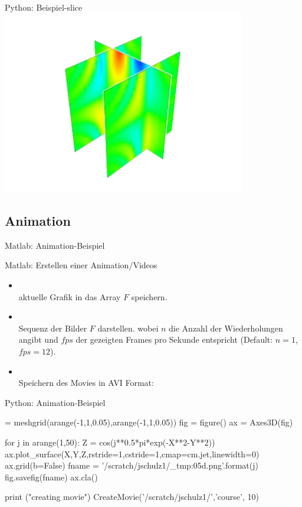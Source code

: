 \documentclass[hyperref={xetex}]{beamer}
\begin{document}
\begin{frame}[fragile]{Python: Beispiel-slice}
\hfil\includegraphics[width=0.8\textwidth]{figures/pyslice}\hfil
\end{frame}

\subsection{Animation}
% 
% 
\begin{frame}[fragile]{Matlab: Animation-Beispiel}
\end{frame}
%
% 
\begin{frame}[fragile]{Matlab: Erstellen einer Animation/Videos}
\begin{itemize}
\item \alert{}\\
aktuelle Grafik in das Array $F$ speichern.
\item \alert{}\\
Sequenz der Bilder $F$ darstellen. wobei $n$ die Anzahl der Wiederholungen angibt und $fps$ der
  gezeigten Frames pro Sekunde entspricht (Default: $n=1$, $fps=12$). 

\item \alert{}\\
Speichern des Movies in AVI Format: \end{itemize}
\end{frame}
% 
% 
\begin{frame}[fragile]{Python: Animation-Beispiel}
  \begin{pyin}
[X,Y] = meshgrid(arange(-1,1,0.05),arange(-1,1,0.05))
fig = figure()
ax = Axes3D(fig)

for j in arange(1,50):
    Z = cos(j**0.5*pi*exp(-X**2-Y**2))
    ax.plot_surface(X,Y,Z,rstride=1,cstride=1,cmap=cm.jet,linewidth=0)
    ax.grid(b=False)
    fname = '/scratch/jschulz1/_tmp{:05d}.png'.format(j) 
    fig.savefig(fname)
    ax.cla()
    
print ("creating movie")
CreateMovie('/scratch/jschulz1/','course', 10)    
  \end{pyin}
\end{frame}

%
%
\end{document}
